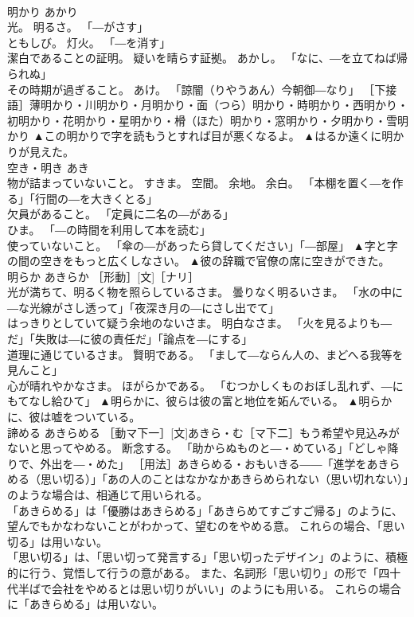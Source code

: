 \documentclass[8pt]{extreport}
\begin{document}
\begin{CJK}{UTF8}{min}
\\	明かり	あかり	
\\	光。 明るさ。 「―がさす」 
\\	ともしび。 灯火。 「―を消す」 
\\	潔白であることの証明。 疑いを晴らす証拠。 あかし。 「なに、―を立てねば帰られぬ」 
\\	その時期が過ぎること。 あけ。 「諒闇（りやうあん）今朝御―なり」 ［下接語］薄明かり・川明かり・月明かり・面（つら）明かり・時明かり・西明かり・初明かり・花明かり・星明かり・榾（ほた）明かり・窓明かり・夕明かり・雪明かり	▲この明かりで字を読もうとすれば目が悪くなるよ。 ▲はるか遠くに明かりが見えた。
\\	空き・明き	あき	
\\	物が詰まっていないこと。 すきま。 空間。 余地。 余白。 「本棚を置く―を作る」「行間の―を大きくとる」 
\\	欠員があること。 「定員に二名の―がある」 
\\	ひま。 「―の時間を利用して本を読む」 
\\	使っていないこと。 「傘の―があったら貸してください」「―部屋」	▲字と字の間の空きをもっと広くしなさい。 ▲彼の辞職で官僚の席に空きができた。
\\	明らか	あきらか	［形動］[文]［ナリ］ 
\\	光が満ちて、明るく物を照らしているさま。 曇りなく明るいさま。 「水の中に―な光線がさし透って」「夜深き月の―にさし出でて」 
\\	はっきりとしていて疑う余地のないさま。 明白なさま。 「火を見るよりも―だ」「失敗は―に彼の責任だ」「論点を―にする」 
\\	道理に通じているさま。 賢明である。 「まして―ならん人の、まどへる我等を見んこと」 
\\	心が晴れやかなさま。 ほがらかである。 「むつかしくものおぼし乱れず、―にもてなし給ひて」	▲明らかに、彼らは彼の富と地位を妬んでいる。 ▲明らかに、彼は嘘をついている。
\\	諦める	あきらめる	［動マ下一］[文]あきら・む［マ下二］もう希望や見込みがないと思ってやめる。 断念する。 「助からぬものと―・めている」「どしゃ降りで、外出を―・めた」 ［用法］あきらめる・おもいきる――「進学をあきらめる（思い切る）」「あの人のことはなかなかあきらめられない（思い切れない）」のような場合は、相通じて用いられる。 
\\	「あきらめる」は「優勝はあきらめる」「あきらめてすごすご帰る」のように、望んでもかなわないことがわかって、望むのをやめる意。 これらの場合、「思い切る」は用いない。 
\\	「思い切る」は、「思い切って発言する」「思い切ったデザイン」のように、積極的に行う、覚悟して行うの意がある。 また、名詞形「思い切り」の形で「四十代半ばで会社をやめるとは思い切りがいい」のようにも用いる。 これらの場合に「あきらめる」は用いない。 

\end{CJK}
\end{document}
